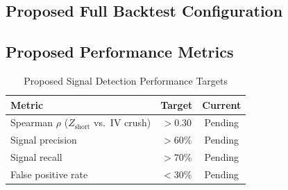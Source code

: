 \documentclass[10pt,twocolumn]{article}
\newcommand{\Zshort}{Z_{\mathrm{short}}}
\begin{document}
\subsection{Proposed Full Backtest Configuration}

\begin{table}[htbp]
\centering
\caption{Proposed Full Backtest Configuration}
\label{tab:config}
\end{table}

\subsection{Proposed Performance Metrics}

\begin{table}[htbp]
\centering
\caption{Proposed Signal Detection Performance Targets}
\label{tab:signal_perf}
\begin{tabular}{lcc}
\toprule
Metric & Target & Current \\
\midrule
Spearman $\rho$ ($\Zshort$ vs.\ IV crush) & $>0.30$ & Pending \\
Signal precision & $>60\%$ & Pending \\
Signal recall   & $>70\%$ & Pending \\
False positive rate & $<30\%$ & Pending \\
\bottomrule
\end{tabular}
\end{table}
\end{document}
